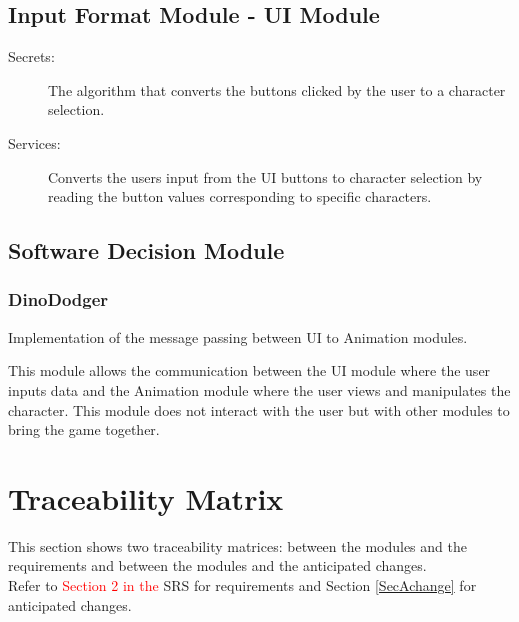 \documentclass[12pt, titlepage]{article}
\begin{document}
\subsection{Input Format Module - UI Module}
\begin{description}
\item[Secrets:] The algorithm that converts the buttons clicked by the user to a character selection.
\item[Services:] Converts the users input from the UI buttons to character selection by reading the button values corresponding to specific characters.
\end{description}

\subsection{Software Decision Module}
\begin{description}

\subsubsection{DinoDodger}
\item[Secrets:] Implementation of the message passing between UI to Animation modules.
\item[Services:] This module allows the communication between the UI module where the user inputs data and the Animation module where the user views and manipulates the character. 
This module does not interact with the user but with other modules to bring the game together.
\end{description}


\section{Traceability Matrix} \label{SecTM}

This section shows two traceability matrices: between the modules and the
requirements and between the modules and the anticipated changes. \\

Refer to \textcolor{red}{Section 2 in the} SRS for requirements and Section \ref{SecAchange} for anticipated changes.
\end{document}
